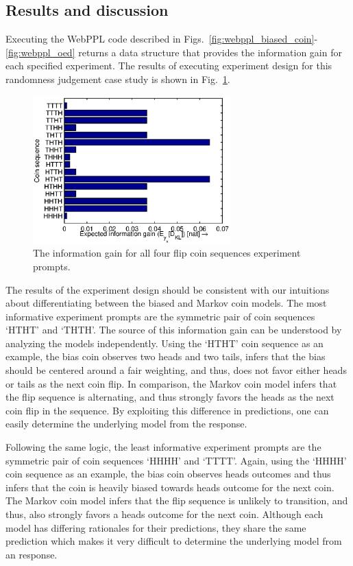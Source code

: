 \documentclass[11pt]{article}
\begin{document}
\subsection{Results and discussion}

Executing the WebPPL code described in Figs.~\ref{fig:webppl_biased_coin}-\ref{fig:webppl_oed} returns a data structure that provides the information gain for each specified experiment. The results of executing experiment design for this randomness judgement case study is shown in Fig.~\ref{fig:coin}.

\begin{figure}[h!]
\centering
\includegraphics[width=3in]{img/coin.eps}
\caption{The information gain for all four flip coin sequences experiment prompts.}
\label{fig:coin}
\end{figure}

The results of the experiment design should be consistent with our intuitions about differentiating between the biased and Markov coin models. The most informative experiment prompts are the symmetric pair of coin sequences `HTHT' and `THTH'. The source of this information gain can be understood by analyzing the models independently. Using the `HTHT' coin sequence as an example, the bias coin observes two heads and two tails, infers that the bias should be centered around a fair weighting, and thus, does not favor either heads or tails as the next coin flip. In comparison, the Markov coin model infers that the flip sequence is alternating, and thus strongly favors the heads as the next coin flip in the sequence. By exploiting this difference in predictions, one can easily determine the underlying model from the response.

Following the same logic, the least informative experiment prompts are the symmetric pair of coin sequences `HHHH' and `TTTT'. Again, using the `HHHH' coin sequence as an example, the bias coin observes heads outcomes and thus infers that the coin is heavily biased towards heads outcome for the next coin. The Markov coin model infers that the flip sequence is unlikely to transition, and thus, also strongly favors a heads outcome for the next coin. Although each model has differing rationales for their predictions, they share the same prediction which makes it very difficult to determine the underlying model from an response. 
\end{document}

